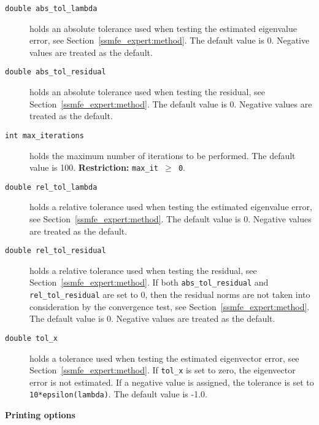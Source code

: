 \begin{description}
%
\item[\texttt{double abs\_tol\_lambda}]
holds an absolute tolerance used when testing the estimated eigenvalue 
error, see Section~\ref{ssmfe_expert:method}. 
The default value is 0. %
Negative values are treated as the default.
%
\item[\texttt{double abs\_tol\_residual}]
holds an absolute tolerance used when testing the residual, 
see Section~\ref{ssmfe_expert:method}.
The default value is 0.
Negative values are treated as the default.
%
\item[\texttt{int max\_iterations}]
holds the maximum number of iterations to be performed.
The default value is 100.
{\bf Restriction:} {\tt max\_it $\ge$ 0}.
%
\item[\texttt{double rel\_tol\_lambda}]
holds a relative tolerance used when testing the estimated eigenvalue 
error, see Section~\ref{ssmfe_expert:method}. 
The default value is 0.
Negative values are treated as the default.
%
\item[\texttt{double rel\_tol\_residual}]
holds a relative tolerance used when testing the residual,
see Section~\ref{ssmfe_expert:method}. 
If both {\tt abs\_tol\_residual} and {\tt rel\_tol\_residual}
are set to 0, then the residual norms are not taken
into consideration by the convergence test,
see Section~\ref{ssmfe_expert:method}.
The default value is 0.
Negative values are treated as the default.
%
\item[\texttt{double tol\_x}]
holds a tolerance used when testing the estimated 
eigenvector error, see Section~\ref{ssmfe_expert:method}. 
If {\tt tol\_x} is set to zero, the eigenvector error is not estimated.
If a negative value is assigned, the tolerance is set to
{\tt 10*epsilon(lambda)}.
The default value is -1.0.
%
\end{description}

\medskip
\noindent
{\bf Printing options}


